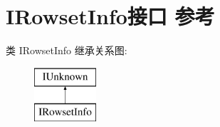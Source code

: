 \hypertarget{interface_i_rowset_info}{}\section{I\+Rowset\+Info接口 参考}
\label{interface_i_rowset_info}
类 I\+Rowset\+Info 继承关系图\+:\begin{figure}[H]
\begin{center}
\leavevmode
\includegraphics[height=2.000000cm]{interface_i_rowset_info}
\end{center}
\end{figure}
